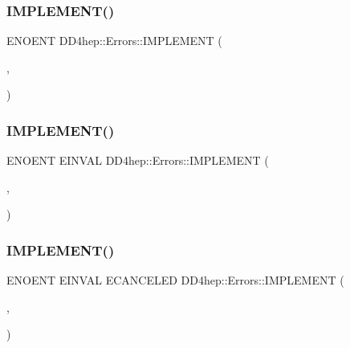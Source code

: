 \subsubsection{\texorpdfstring{I\+M\+P\+L\+E\+M\+E\+N\+T()}{IMPLEMENT()}\hspace{0.1cm}{\footnotesize\ttfamily [2/4]}}
{\footnotesize\ttfamily E\+N\+O\+E\+NT D\+D4hep\+::\+Errors\+::\+I\+M\+P\+L\+E\+M\+E\+NT (\begin{DoxyParamCaption}\item[{\hyperlink{namespace_d_d4hep_1_1_errors_af232117521264a5f6e1211c887e265fd}{io\+Error}}]{,  }\item[{E\+IO}]{ }\end{DoxyParamCaption})}

\hypertarget{namespace_d_d4hep_1_1_errors_a7875dfba79f4c8a0fbc5b9786730ca20}{}\label{namespace_d_d4hep_1_1_errors_a7875dfba79f4c8a0fbc5b9786730ca20} 
\subsubsection{\texorpdfstring{I\+M\+P\+L\+E\+M\+E\+N\+T()}{IMPLEMENT()}\hspace{0.1cm}{\footnotesize\ttfamily [3/4]}}
{\footnotesize\ttfamily E\+N\+O\+E\+NT E\+I\+N\+V\+AL D\+D4hep\+::\+Errors\+::\+I\+M\+P\+L\+E\+M\+E\+NT (\begin{DoxyParamCaption}\item[{\hyperlink{namespace_d_d4hep_1_1_errors_a70d74e1cb3eced52822c830c2bf4990b}{no\+Sys}}]{,  }\item[{E\+N\+O\+S\+YS}]{ }\end{DoxyParamCaption})}

\hypertarget{namespace_d_d4hep_1_1_errors_ad826680faeb314dfa60c60a0d4ee3692}{}\label{namespace_d_d4hep_1_1_errors_ad826680faeb314dfa60c60a0d4ee3692} 
\subsubsection{\texorpdfstring{I\+M\+P\+L\+E\+M\+E\+N\+T()}{IMPLEMENT()}\hspace{0.1cm}{\footnotesize\ttfamily [4/4]}}
{\footnotesize\ttfamily E\+N\+O\+E\+NT E\+I\+N\+V\+AL E\+C\+A\+N\+C\+E\+L\+ED D\+D4hep\+::\+Errors\+::\+I\+M\+P\+L\+E\+M\+E\+NT (\begin{DoxyParamCaption}\item[{\hyperlink{namespace_d_d4hep_1_1_errors_a6e59237308b289629424651a17eb8163}{link\+Range}}]{,  }\item[{E\+L\+N\+R\+NG}]{ }\end{DoxyParamCaption})}

